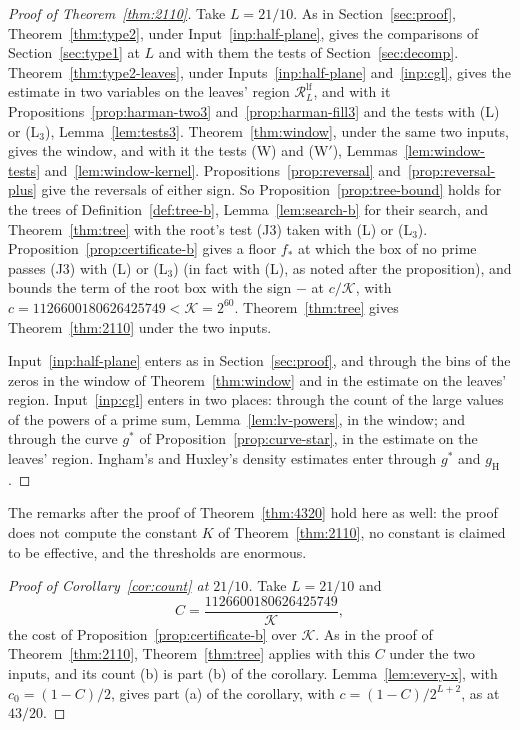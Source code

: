 \documentclass[11pt]{article}
\theoremstyle{definition}
\begin{document}
\begin{proof}[Proof of Theorem~\ref{thm:2110}]
Take $L = 21/10$. As in Section~\ref{sec:proof}, Theorem~\ref{thm:type2}, under Input~\ref{inp:half-plane}, gives the
comparisons of Section~\ref{sec:type1} at $L$ and with them the tests of Section~\ref{sec:decomp}.
Theorem~\ref{thm:type2-leaves}, under Inputs~\ref{inp:half-plane} and~\ref{inp:cgl}, gives the estimate in two variables
on the leaves' region $\mathcal R^{\mathrm{lf}}_L$, and with it Propositions~\ref{prop:harman-two3}
and~\ref{prop:harman-fill3} and the tests with (L) or (L$_3$), Lemma~\ref{lem:tests3}. Theorem~\ref{thm:window}, under
the same two inputs, gives the window, and with it the tests (W) and (W$'$), Lemmas~\ref{lem:window-tests}
and~\ref{lem:window-kernel}. Propositions~\ref{prop:reversal} and~\ref{prop:reversal-plus} give the reversals of
either sign. So Proposition~\ref{prop:tree-bound} holds for the trees of Definition~\ref{def:tree-b},
Lemma~\ref{lem:search-b} for their search, and Theorem~\ref{thm:tree} with the root's test (J3) taken with (L) or
(L$_3$). Proposition~\ref{prop:certificate-b} gives a floor $f_*$ at which the box of no prime passes (J3) with (L) or
(L$_3$) (in fact with (L), as noted after the proposition), and bounds the term of the root box with the sign $-$ at
$c/\mathcal K$, with $c = 1126600180626425749 < \mathcal K = 2^{60}$. Theorem~\ref{thm:tree} gives
Theorem~\ref{thm:2110} under the two inputs.

Input~\ref{inp:half-plane} enters as in Section~\ref{sec:proof}, and through the bins of the zeros in the window of
Theorem~\ref{thm:window} and in the estimate on the leaves' region. Input~\ref{inp:cgl} enters in two places: through
the count of the large values of the powers of a prime sum, Lemma~\ref{lem:lv-powers}, in the window; and through the
curve $g^*$ of Proposition~\ref{prop:curve-star}, in the estimate on the leaves' region. Ingham's and Huxley's density
estimates enter through $g^*$ and $g_{\mathrm H}$.
\end{proof}

The remarks after the proof of Theorem~\ref{thm:4320} hold here as well: the proof does not compute the constant $K$
of Theorem~\ref{thm:2110}, no constant
is claimed to be effective, and the thresholds are enormous.

\begin{proof}[Proof of Corollary~\ref{cor:count} at $21/10$]
Take $L = 21/10$ and
\[
  C = \frac{1126600180626425749}{\mathcal K},
\]
the cost of Proposition~\ref{prop:certificate-b} over $\mathcal K$. As in the proof of Theorem~\ref{thm:2110},
Theorem~\ref{thm:tree} applies with this $C$ under the two
inputs, and its count (b) is part (b) of the corollary. Lemma~\ref{lem:every-x}, with $c_0 = (1 - C)/2$, gives
part (a) of the corollary, with $c = (1 - C)/2^{L + 2}$, as at $43/20$.
\end{proof}
\end{document}
